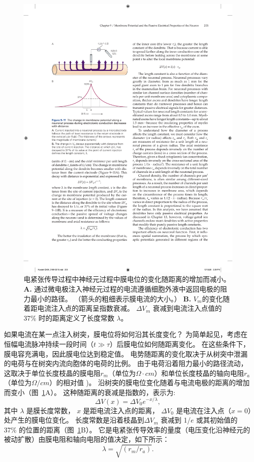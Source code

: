 \begin{figure}[htbp]
	\centering
	\includegraphics[width=0.6\linewidth]{chap09/fig_9_11}
	\caption{电紧张传导过程中神经元过程中膜电位的变化随距离的增加而减小。
		\textbf{A.} 通过微电极注入神经元过程的电流遵循细胞外液中返回电极的阻力最小的路径。
		（箭头的粗细表示膜电流的大小。）
		\textbf{B.} $V_m$的变化随着距电流注入点的距离呈指数衰减。
		$\Delta V_m$ 衰减到电流注入点值的 37\% 时的距离定义了长度常数 $\lambda$。}
	\label{fig:9_11}
\end{figure}

如果电流在某一点注入树突，膜电位将如何沿其长度变化？
为简单起见，考虑在恒幅电流脉冲持续一段时间（$t \gg \tau$）后膜电位如何随距离变化。
在这些条件下，膜电容充满电，因此膜电位达到稳定值。
电势随距离的变化取决于从树突中泄漏的电荷与在树突内流向胞体的电荷的比例。
由于电荷沿着阻力最小的路径流动，这取决于单位长度枝晶的膜电阻$r_m$（单位为$\Omega \cdot cm$）和单位长度枝晶的轴向电阻$r_a$（单位为$\Omega/cm$）的相对值 )。
沿树突的膜电位变化随着与电流电极的距离的增加而变小（图~\ref{fig:9_11}A）。
这种随距离的衰减是指数的，表示为:
\begin{equation}
	\Delta V(x) = 
		\Delta V_0 e^{-x/\lambda},
\end{equation}
其中 $\lambda$ 是膜长度常数，
$x$ 是距电流注入点的距离，
$\Delta V_0$ 是电流在注入点（$x = 0$）处产生的膜电位变化。
长度常数是沿着枝晶到$\Delta V_m$ 衰减到 1/$e$ 或其初始值的 37\% 的位置的距离（图~\ref{fig:9_11}B）。
它是电紧张传导效率的量度（电压变化沿神经元的被动扩散）由膜电阻和轴向电阻的值决定，如下所示：
\begin{equation}
	\lambda = \sqrt{(r_m / r_a)}.
\end{equation}


